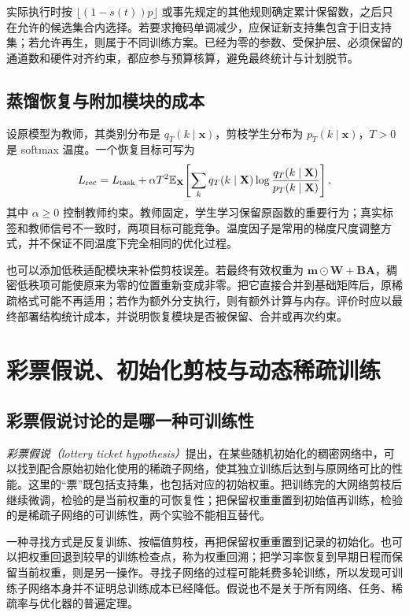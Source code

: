 \documentclass[UTF8,12pt,a4paper,fontset=fandol]{ctexart}
\begin{document}
实际执行时按 $\lfloor(1-s(t))p\rfloor$ 或事先规定的其他规则确定累计保留数，之后只在允许的候选集合内选择。若要求掩码单调减少，应保证新支持集包含于旧支持集；若允许再生，则属于不同训练方案。已经为零的参数、受保护层、必须保留的通道数和硬件对齐约束，都应参与预算核算，避免最终统计与计划脱节。

\subsection{蒸馏恢复与附加模块的成本}
设原模型为教师，其类别分布是 $q_T(k\mid\mathbf x)$，剪枝学生分布为 $p_T(k\mid\mathbf x)$，$T>0$ 是 softmax 温度。一个恢复目标可写为
\begin{equation}
 L_{\rm rec}=L_{\rm task}+\alpha T^2
 \mathbb E_{\mathbf X}\!\left[
 \sum_k q_T(k\mid\mathbf X)
 \log\frac{q_T(k\mid\mathbf X)}{p_T(k\mid\mathbf X)}\right],
 \label{eq:prune-distill}
\end{equation}
其中 $\alpha\geq0$ 控制教师约束。教师固定，学生学习保留原函数的重要行为；真实标签和教师信号不一致时，两项目标可能竞争。温度因子是常用的梯度尺度调整方式，并不保证不同温度下完全相同的优化过程。

也可以添加低秩适配模块来补偿剪枝误差。若最终有效权重为 $\mathbf m\odot\mathbf W+\mathbf B\mathbf A$，稠密低秩项可能使原来为零的位置重新变成非零。把它直接合并到基础矩阵后，原稀疏格式可能不再适用；若作为额外分支执行，则有额外计算与内存。评价时应以最终部署结构统计成本，并说明恢复模块是否被保留、合并或再次约束。

\section{彩票假说、初始化剪枝与动态稀疏训练}
\label{sec:prune-sparse-training}

\subsection{彩票假说讨论的是哪一种可训练性}
\emph{彩票假说（lottery ticket hypothesis）}提出，在某些随机初始化的稠密网络中，可以找到配合原始初始化使用的稀疏子网络，使其独立训练后达到与原网络可比的性能\cite{frankle2019}。这里的“票”既包括支持集，也包括对应的初始权重。把训练完的大网络剪枝后继续微调，检验的是当前权重的可恢复性；把保留权重重置到初始值再训练，检验的是稀疏子网络的可训练性，两个实验不能相互替代。

一种寻找方式是反复训练、按幅值剪枝，再把保留权重重置到记录的初始化。也可以把权重回退到较早的训练检查点，称为权重回溯；把学习率恢复到早期日程而保留当前权重，则是另一操作。寻找子网络的过程可能耗费多轮训练，所以发现可训练子网络本身并不证明总训练成本已经降低。假说也不是关于所有网络、任务、稀疏率与优化器的普遍定理。
\end{document}
